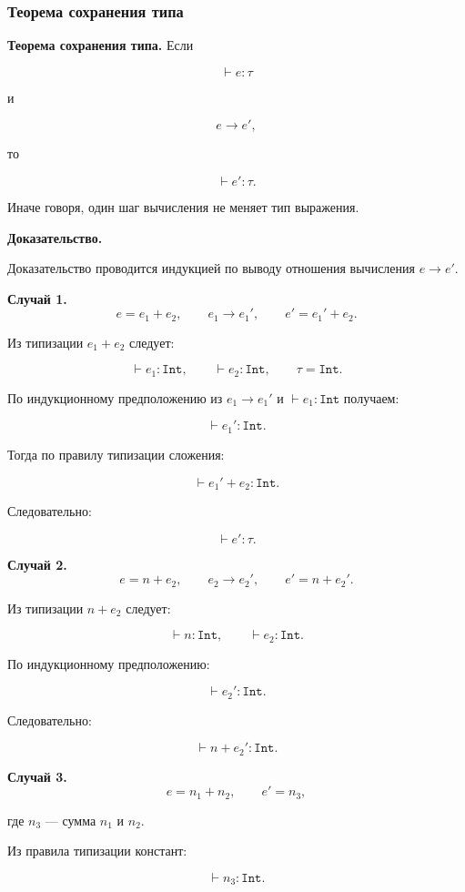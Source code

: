 \documentclass[12pt,a4paper]{article}
\begin{document}
\subsubsection{Теорема сохранения типа}

\textbf{Теорема сохранения типа.}
Если

\[
\vdash e : \tau
\]

и

\[
e \to e',
\]

то

\[
\vdash e' : \tau.
\]

Иначе говоря, один шаг вычисления не меняет тип выражения.

\textbf{Доказательство.}

Доказательство проводится индукцией по выводу отношения вычисления \(e \to e'\).

\textbf{Случай 1.}
\[
e = e_1 + e_2,
\qquad
e_1 \to e_1',
\qquad
e' = e_1' + e_2.
\]

Из типизации \(e_1 + e_2\) следует:

\[
\vdash e_1 : \texttt{Int},
\qquad
\vdash e_2 : \texttt{Int},
\qquad
\tau = \texttt{Int}.
\]

По индукционному предположению из \(e_1 \to e_1'\) и
\(\vdash e_1 : \texttt{Int}\) получаем:

\[
\vdash e_1' : \texttt{Int}.
\]

Тогда по правилу типизации сложения:

\[
\vdash e_1' + e_2 : \texttt{Int}.
\]

Следовательно:

\[
\vdash e' : \tau.
\]

\textbf{Случай 2.}
\[
e = n + e_2,
\qquad
e_2 \to e_2',
\qquad
e' = n + e_2'.
\]

Из типизации \(n + e_2\) следует:

\[
\vdash n : \texttt{Int},
\qquad
\vdash e_2 : \texttt{Int}.
\]

По индукционному предположению:

\[
\vdash e_2' : \texttt{Int}.
\]

Следовательно:

\[
\vdash n + e_2' : \texttt{Int}.
\]

\textbf{Случай 3.}
\[
e = n_1 + n_2,
\qquad
e' = n_3,
\]

где \(n_3\) --- сумма \(n_1\) и \(n_2\).

Из правила типизации констант:

\[
\vdash n_3 : \texttt{Int}.
\]
\end{document}
